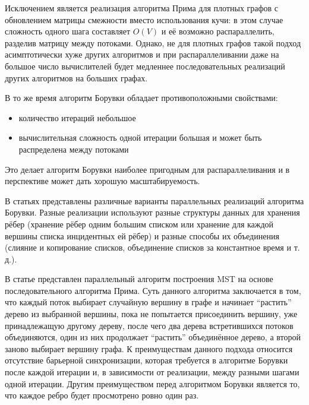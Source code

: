 \documentclass[a4paper,10pt]{extarticle}
\begin{document}
Исключением является реализация алгоритма Прима для плотных графов с обновлением матрицы смежности вместо использования кучи: в этом случае сложность одного шага составляет $O(V)$ и её возможно распараллелить, разделив матрицу между потоками. Однако, не для плотных графов такой подход асимптотически хуже других алгоритмов и при распараллеливании даже на большое число вычислителей будет медленнее последовательных реализаций других алгоритмов на больших графах.

В то же время алгоритм Борувки обладает противоположными свойствами:
\begin{itemize}
	\item количество итераций небольшое
	\item вычислительная сложность одной итерации большая и может быть распределена между потоками
\end{itemize}
Это делает алгоритм Борувки наиболее пригодным для распараллеливания и в перспективе может дать хорошую масштабируемость.

В статьях \cite{dense-mst,boruvka-prima,boruvka-cm5} представлены различные варианты параллельных реализаций алгоритма Борувки.
Разные реализации используют разные структуры данных для хранения рёбер (хранение рёбер одним большим списком или хранение для каждой вершины списка инцидентных ей рёбер) и разные способы их объединения (слияние и копирование списков, объединение списков за константное время и т. д.).

В статье \cite{boruvka-prima} представлен параллельный алгоритм построения MST на основе последовательного алгоритма Прима.
Суть данного алгоритма заключается в том, что каждый поток выбирает случайную вершину в графе и начинает ``растить'' дерево из выбранной вершины, пока не попытается присоединить вершину, уже принадлежащую другому дереву, после чего два дерева встретившихся потоков объединяются, один из них продолжает ``растить'' объединённое дерево, а второй заново выбирает вершину графа. %
К преимуществам данного подхода относится отсутствие барьерной синхронизации, которая требуется в алгоритме Борувки после каждой итерации и, в зависимости от реализации, между разными шагами одной итерации. Другим преимуществом перед алгоритмом Борувки является то, что каждое ребро будет просмотрено ровно один раз.
\end{document}
